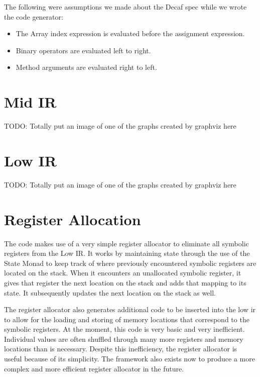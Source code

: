 \documentclass[11pt]{article}
\begin{document}
The following were assumptions we made about the Decaf spec while we
wrote the code generator: 

\begin{itemize}
\item The Array index expression is evaluated before the assignment expression. 
\item Binary operators are evaluated left to right. 
\item Method arguments are evaluated right to left. 
\end{itemize}

\section {Mid IR}
\label{sec:midir}

TODO: Totally put an image of one of the graphs created by graphviz here 

\section {Low IR} 
\label{sec:lowir}

TODO: Totally put an image of one of the graphs created by graphviz here 

\section {Register Allocation} 
\label{sec:regalloc}

The code makes use of a very simple register allocator to eliminate
all symbolic registers from the Low IR. It works by maintaining state
through the use of the State Monad to keep track of where previously
encountered symbolic registers are located on the stack. When it
encounters an unallocated symbolic register, it gives that register
the next location on the stack and adds that mapping to its state. It
subsequently updates the next location on the stack as well. 

The register allocator also generates additional code to be inserted
into the low ir to allow for the loading and storing of memory
locations that correspond to the symbolic registers. At the moment,
this code is very basic and very inefficient. Individual values are
often shuffled through many more registers and memory locations than is
necessary. Despite this inefficiency, the register allocator is useful
because of its simplicity. The framework also exists now to produce a
more complex and more efficient register allocator in the future. 
\end{document}
